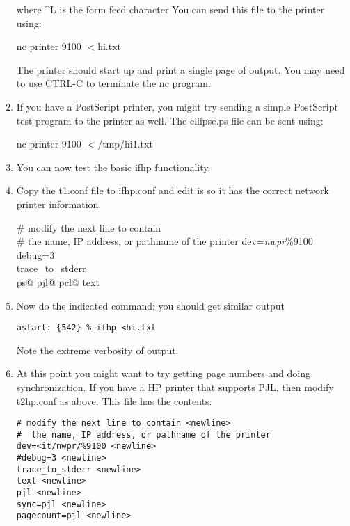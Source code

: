 \documentclass[a4paper]{article}
\begin{document}
\begin{enumerate}
where {\ttfamily \^{}L} is the form feed character
You can send this file to the printer using:
\begin{tscreen}
nc printer 9100 $<$hi.txt
\end{tscreen}

The printer should start up and print a single page of output.
You may need to use
{\ttfamily CTRL-C} to 
terminate the
{\ttfamily nc}
program.

\item If you have a PostScript printer,
you might try sending a simple PostScript test program to the printer
as well.
The
{\ttfamily ellipse.ps}
file can be sent using:
\begin{tscreen}
nc printer 9100 $<$/tmp/hi1.txt
\end{tscreen}
\item You can now test the basic
{\ttfamily ifhp}
functionality.
\item Copy the
{\ttfamily t1.conf}
file to
{\ttfamily ifhp.conf}
and edit is so it has the correct network printer information.
\begin{tscreen}
\# modify the next line to contain \\ 
\#  the name, IP address, or pathname of the printer
dev={\itshape nwpr\/}\%9100 \\ 
debug=3 \\ 
trace\_to\_stderr \\ 
ps@
pjl@
pcl@
text 
\end{tscreen}
\item Now do the indicated command; you should get similar output
\begin{tscreen}
\begin{verbatim}
astart: {542} % ifhp <hi.txt
\end{verbatim}
\end{tscreen}

Note the extreme verbosity of output.
\item At this point you might want to try getting page numbers and doing
synchronization.
If you have a HP printer that supports PJL,
then modify
{\ttfamily t2hp.conf} as above.
This file has the contents:
\begin{tscreen}
\begin{verbatim}
# modify the next line to contain <newline>
#  the name, IP address, or pathname of the printer
dev=<it/nwpr/%9100 <newline>
#debug=3 <newline>
trace_to_stderr <newline>
text <newline>
pjl <newline>
sync=pjl <newline>
pagecount=pjl <newline>
\end{verbatim}
\end{tscreen}


\end{enumerate}
\end{document}
